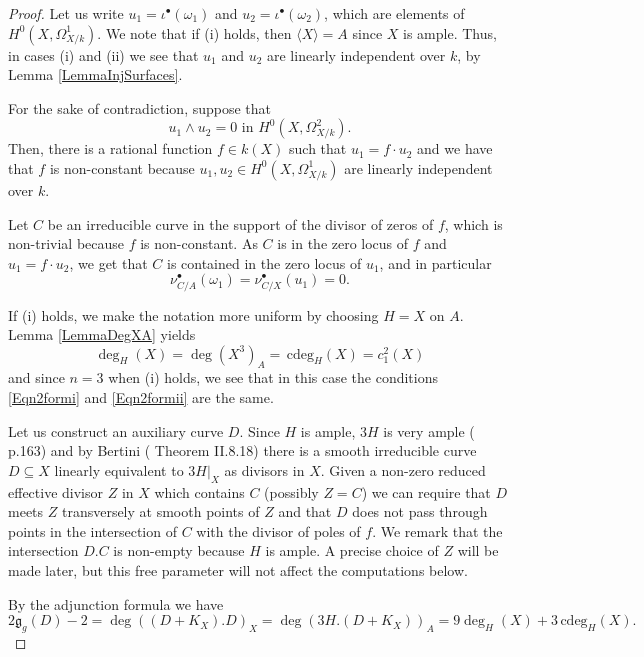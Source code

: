 \documentclass[11pt]{amsart}
\theoremstyle{remark}
\numberwithin{equation}{section}
\newcommand{\gfrak}{\mathfrak{g}}
\newcommand{\cdeg}{\,\mathrm{cdeg}}
\begin{document}
\begin{proof}  Let us write $u_1=\iota^\bullet (\omega_1)$ and $u_2=\iota^\bullet (\omega_2)$, which are elements of $H^0(X,\Omega^1_{X/k})$.  We note that if (i) holds, then $\langle X\rangle=A$ since $X$ is ample. Thus, in cases (i) and (ii) we see that $u_1$ and $u_2$ are linearly independent over $k$, by Lemma \ref{LemmaInjSurfaces}. 


For the sake of contradiction, suppose that 
\begin{equation}\label{Eqncontr}
u_1\wedge u_2=0 \mbox{ in } H^0(X,\Omega^2_{X/k}). 
\end{equation}
Then, there is a rational function $f\in k(X)$ such that $u_1 = f \cdot u_2$ and we have that $f$ is non-constant because $u_1,u_2\in H^0(X,\Omega^1_{X/k})$ are linearly independent over $k$. 

Let $C$ be an irreducible curve in the support of the divisor of zeros of $f$, which is non-trivial because $f$ is non-constant.  As $C$ is in the zero locus of $f$ and $u_1=f\cdot u_2$, we get that $C$ is contained in the zero locus of $u_1$, and in particular 
\begin{equation}\label{Eqnw1int}
\nu_{C/A}^\bullet(\omega_1)=\nu_{C/X}^\bullet(u_1)=0.
\end{equation}


If (i) holds, we make the notation more uniform by choosing $H=X$ on $A$.   Lemma \ref{LemmaDegXA} yields  
\begin{equation}\label{Eqnci1}
\deg_H(X)=\deg(X^3)_A=\cdeg_H(X)=c_1^2(X)
\end{equation}
and since $n=3$ when (i) holds, we see that in this case the conditions \eqref{Eqn2formi} and \eqref{Eqn2formii} are the same.


Let us construct an auxiliary curve $D$. Since $H$ is ample, $3H$ is very ample (\cite{Mumford} p.163) and by Bertini (\cite{Hartshorne} Theorem II.8.18) there is a smooth irreducible curve $D\subseteq X$ linearly equivalent to $3H|_X$ as divisors in $X$. Given a non-zero reduced effective divisor $Z$ in $X$ which contains $C$  (possibly $Z=C$) we can require that $D$ meets $Z$ transversely at smooth points of $Z$ and that $D$ does not pass through points in the intersection of $C$ with the divisor of poles of $f$. We remark that the intersection $D.C$ is non-empty because $H$ is ample. A precise choice of $Z$ will be made later, but this free parameter will not affect the computations below.


By the adjunction formula we have
\begin{equation}\label{Eqn2form0}
2\gfrak_g(D)-2 = \deg ((D+K_X).D)_X = \deg (3H.(D+K_X))_A = 9\deg_H(X) + 3\cdeg_H(X).
\end{equation}



\end{proof}
\end{document}
